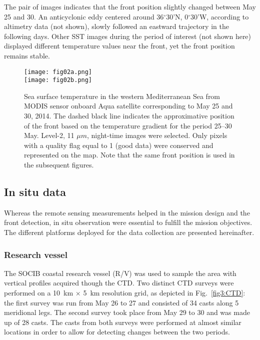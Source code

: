 \documentclass[essd]{copernicus}
\begin{document}
The pair of images indicates that the front position slightly changed between May 25 and 30. An anticyclonic eddy centered around 36$^{\circ}$30'N, 0$^{\circ}$30'W, according to altimetry data (not shown), slowly followed an eastward trajectory in the following days. Other SST images during the period of interest (not shown here) displayed different temperature values near the front, yet the front position remains stable. 

\begin{figure}[t]
\texttt{[image: fig02a.png]}\\
\texttt{[image: fig02b.png]}
\caption{Sea surface temperature in the western Mediterranean Sea from MODIS sensor onboard Aqua satellite corresponding to May 25 and 30, 2014. The dashed black line indicates the approximative position of the front based on the temperature gradient for the period 25--30 May. Level-2, 11 $\mu m$, night-time images were selected. Only pixels with a quality flag equal to 1 (good data) were conserved and represented on the map. Note that the same front position is used in the subsequent figures.\label{fig2:SST}}
\end{figure}

\subsection{In situ data}

Whereas the remote sensing measurements helped in the mission design and the front detection, in situ observation were essential to fulfill the mission objectives. The different platforms deployed for the data collection are presented hereinafter.

\subsubsection{Research vessel}

The SOCIB coastal research vessel (R/V) was used to sample the area with vertical profiles acquired though the CTD. Two distinct CTD surveys were performed on a 10~km $\times$ 5~km resolution grid, as depicted in Fig.~\ref{fig3:CTD}: the first survey was run from May 26 to 27 and consisted of 34 casts along 5 meridional legs. The second survey took place from May 29 to 30 and was made up of 28 casts. The casts from both surveys were performed at almost similar locations in order to allow for detecting changes between the two periods. 
\end{document}
